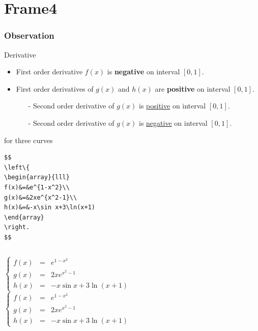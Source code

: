 \documentclass[mathserif]{beamer}
\begin{document}
\section{Frame4}
\begin{frame}
\frametitle{Observation}
\begin{block}{Derivative}
\begin{itemize}
\item First order derivative $f(x)$ is \textbf{negative} on interval $[0, 1]$.
\item First order derivatives of $g(x)$ and $h(x)$ are \textbf{positive} on interval $[0, 1]$.
\begin{itemize}
\item[-] Second order derivative of $g(x)$ is \underline{positive} on interval $[0, 1]$.
\item[-] Second order derivative of $g(x)$ is \underline{negative} on interval $[0, 1]$.
\end{itemize}
\end{itemize}
\end{block}
\hyperlink{3}{}for three curves
\end{frame}
\begin{frame}[fragile]
\begin{verbatim}
$$
\left\{
\begin{array}{lll}
f(x)&=&e^{1-x^2}\\
g(x)&=&2xe^{x^2-1}\\
h(x)&=&-x\sin x+3\ln(x+1)
\end{array}
\right.
$$
\end{verbatim}
\end{frame}
\begin{frame}
\begin{columns}
$$
\left\{
\begin{array}{lll}
f(x)&=&e^{1-x^2}\\
g(x)&=&2xe^{x^2-1}\\
h(x)&=&-x\sin x+3\ln(x+1)
\end{array}
\right.
$$
$$
\left\{
\begin{array}{lll}
f(x)&=&e^{1-x^2}\\
g(x)&=&2xe^{x^2-1}\\
h(x)&=&-x\sin x+3\ln(x+1)
\end{array}
\right.
$$
\end{columns}
\end{frame}
\end{document}
